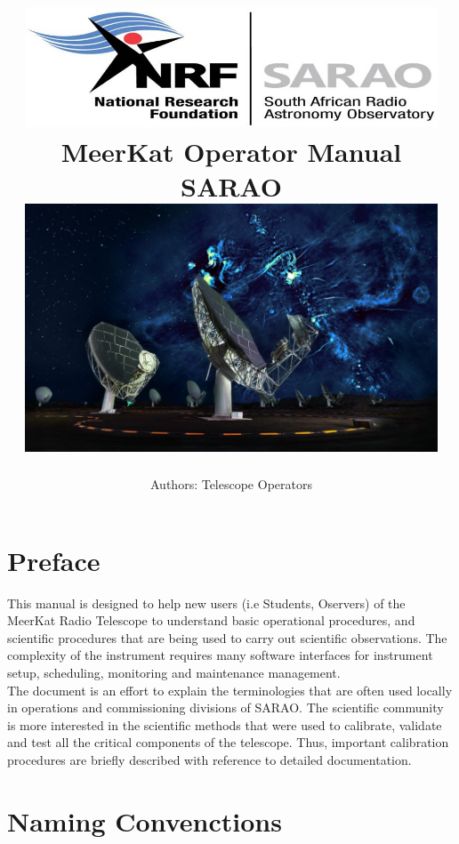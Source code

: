 \documentclass[12pt]{report}
\title{
	{\includegraphics[width=12.3cm]{logo2.png}}\\
	\vspace{1.5cm}
	\vspace{1.5cm}
	{MeerKat Operator Manual}\\
	{\large SARAO}\\
	\vspace{1.5cm}
	{\includegraphics[width=12.3cm]{cover.jpg}}
}
\author{Authors:  Telescope Operators}
\date{}
\begin{document}
\maketitle
 
 

 
 \chapter*{Preface}

This manual is designed to help new users (i.e Students, Oservers) of the MeerKat Radio Telescope to understand basic operational procedures, and scientific procedures that are being used to carry out scientific observations.  The complexity of the instrument requires many software interfaces for instrument setup, scheduling, monitoring and maintenance management. \\

The document is an effort to explain the terminologies that are often used locally in operations and commissioning divisions of SARAO.  The scientific community is more interested in the scientific methods that were used to calibrate, validate and test all the critical components of the telescope. Thus,  important calibration  procedures are briefly described with reference to detailed documentation.



 \chapter*{Naming Convenctions }
\end{document}
